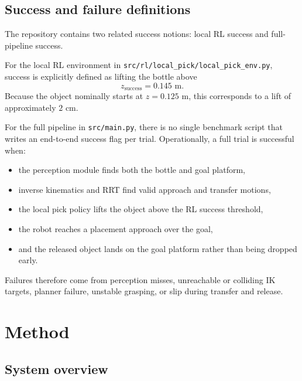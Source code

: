 \documentclass[11pt]{article}
\begin{document}
\subsection{Success and failure definitions}

The repository contains two related success notions: local RL success and full-pipeline success.

For the local RL environment in \texttt{src/rl/local\_pick/local\_pick\_env.py}, success is explicitly defined as lifting the bottle above
\[
z_{\text{success}} = 0.145 \text{ m}.
\]
Because the object nominally starts at \(z = 0.125\) m, this corresponds to a lift of approximately \(2\) cm.

For the full pipeline in \texttt{src/main.py}, there is no single benchmark script that writes an end-to-end success flag per trial. Operationally, a full trial is successful when:
\begin{itemize}[leftmargin=*]
    \item the perception module finds both the bottle and goal platform,
    \item inverse kinematics and RRT find valid approach and transfer motions,
    \item the local pick policy lifts the object above the RL success threshold,
    \item the robot reaches a placement approach over the goal,
    \item and the released object lands on the goal platform rather than being dropped early.
\end{itemize}

Failures therefore come from perception misses, unreachable or colliding IK targets, planner failure, unstable grasping, or slip during transfer and release.

\section{Method}

\subsection{System overview}
\end{document}
